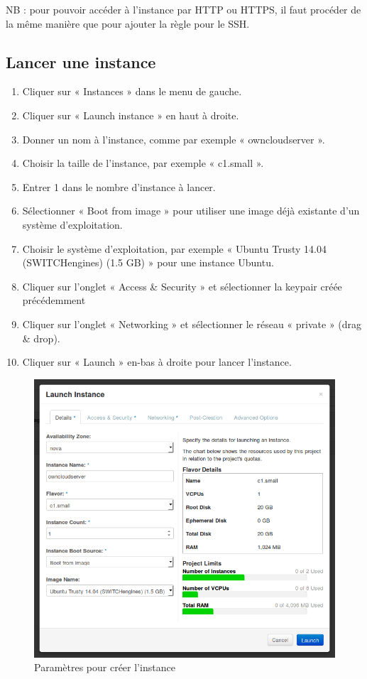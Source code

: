 \noindent NB : pour pouvoir accéder à l'instance par HTTP ou HTTPS, il faut procéder de la même manière que pour ajouter la règle pour le SSH.
      
    
\subsection{Lancer une instance}

\begin{enumerate}
 \item Cliquer sur « Instances » dans le menu de gauche.
 \item Cliquer sur « Launch instance » en haut à droite.
 \item Donner un nom à l'instance, comme par exemple « owncloudserver ».
 \item Choisir la taille de l'instance, par exemple « c1.small ».
 \item Entrer 1 dans le nombre d'instance à lancer.
 \item Sélectionner « Boot from image » pour utiliser une image déjà existante d'un système d'exploitation.
 \item Choisir le système d'exploitation, par exemple « Ubuntu Trusty 14.04 (SWITCHengines) (1.5 GB) » pour une instance Ubuntu.
 \item Cliquer sur l'onglet « Access \& Security » et sélectionner la keypair créée précédemment
 \item Cliquer sur l'onglet « Networking » et sélectionner le réseau « private » (drag \& drop).
 \item Cliquer sur « Launch » en-bas à droite pour lancer l'instance. 
\end{enumerate}
    
\begin{figure}[h]
  \centering
    \includegraphics[width=0.7\linewidth]{img/instanceCreation1.png}
  \caption{Paramètres pour créer l'instance}
  \label{instanceCreation1}
\end{figure}

